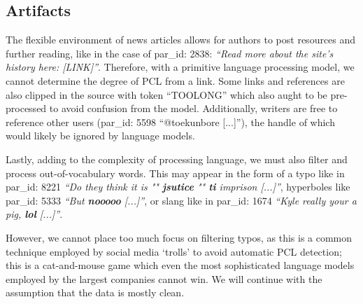 \documentclass[11pt,a4paper]{article}
\begin{document}
\subsection{Artifacts}\label{sect:artifacts}

The flexible environment of news articles allows for authors to post resources and further reading, like in the case of par\_id: 2838: \emph{``Read more about the site's history here: [LINK]''}. Therefore, with a primitive language processing model, we cannot determine the degree of PCL from a link. Some links and references are also clipped in the source with token ``TOOLONG'' which also aught to be pre-processed to avoid confusion from the model. Additionally, writers are free to reference other users (par\_id: 5598 ``@toekunbore [...]''), the handle of which would likely be ignored by language models.

Lastly, adding to the complexity of processing language, we must also filter and process out-of-vocabulary words. This may appear in the form of a typo like in par\_id: 8221 \emph{``Do they think it is "" \textbf{jsutice} "" \textbf{ti} imprison [...]''}, hyperboles like par\_id: 5333 \emph{``But \textbf{nooooo} [...]''}, or slang like in par\_id: 1674 \emph{``Kyle really your a pig, \textbf{lol} [...]''}.

However, we cannot place too much focus on filtering typos, as this is a common technique employed by social media `trolls' to avoid automatic PCL detection; this is a cat-and-mouse game which even the most sophisticated language models employed by the largest companies cannot win. We will continue with the assumption that the data is mostly clean.


\end{document}
